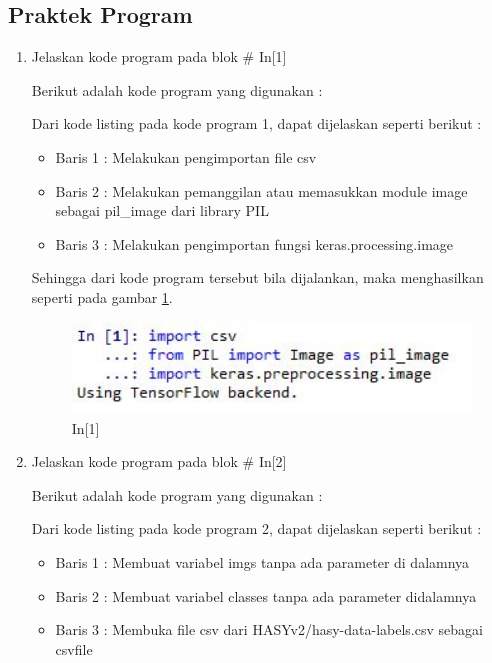 \subsection{Praktek Program}
\begin{enumerate}
\item Jelaskan kode program pada blok \# In[1]
\par Berikut adalah kode program yang digunakan :

\par Dari kode listing pada kode program 1, dapat dijelaskan seperti berikut :
\begin{itemize}
\item Baris 1	: Melakukan pengimportan file csv
\item Baris 2	: Melakukan pemanggilan atau memasukkan module image sebagai pil\_image dari library PIL
\item Baris 3	: Melakukan pengimportan fungsi keras.processing.image 
\end{itemize}
\par Sehingga dari kode program tersebut bila dijalankan, maka menghasilkan seperti pada gambar \ref{c7_8}.
\begin{figure}[!htbp]
	\centerline{\includegraphics[width=1\textwidth]{figures/huda/chapter7/8.JPG}}
	\caption{In[1]}
	\label{c7_8}
\end{figure}
\item Jelaskan kode program pada blok \# In[2]
\par Berikut adalah kode program yang digunakan :

\par Dari kode listing pada kode program 2, dapat dijelaskan seperti berikut :
\begin{itemize}
\item Baris 1	: Membuat variabel imgs tanpa ada parameter di dalamnya
\item Baris 2	: Membuat variabel classes tanpa ada parameter didalamnya
\item Baris 3	: Membuka file csv dari HASYv2/hasy-data-labels.csv sebagai csvfile

\end{itemize}
\end{enumerate}
